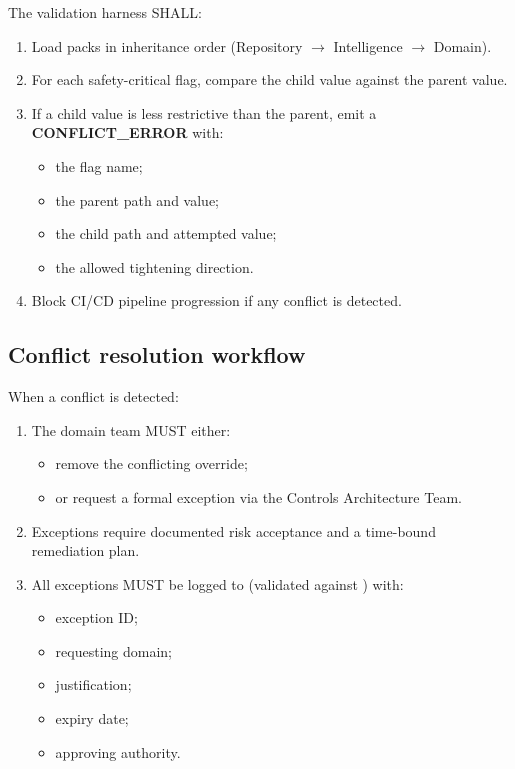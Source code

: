 The validation harness SHALL:
\begin{enumerate}
  \item Load packs in inheritance order (Repository $\rightarrow$
    Intelligence $\rightarrow$ Domain).
  \item For each safety-critical flag, compare the child value against
    the parent value.
  \item If a child value is less restrictive than the parent, emit a
    \textbf{CONFLICT\_ERROR} with:
    \begin{itemize}
      \item the flag name;
      \item the parent path and value;
      \item the child path and attempted value;
      \item the allowed tightening direction.
    \end{itemize}
  \item Block CI/CD pipeline progression if any conflict is detected.
\end{enumerate}

\subsection{Conflict resolution workflow}

When a conflict is detected:
\begin{enumerate}
  \item The domain team MUST either:
    \begin{itemize}
      \item remove the conflicting override;
      \item or request a formal exception via the Controls Architecture
        Team.
    \end{itemize}
  \item Exceptions require documented risk acceptance and a time-bound
    remediation plan.
  \item All exceptions MUST be logged to
     (validated
    against ) with:
    \begin{itemize}
      \item exception ID;
      \item requesting domain;
      \item justification;
      \item expiry date;
      \item approving authority.
    \end{itemize}
\end{enumerate}

